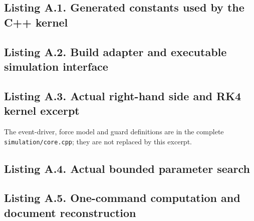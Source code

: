 \documentclass[11pt,a4paper]{article}
\begin{document}
\subsection*{Listing A.1. Generated constants used by the C++ kernel}

\clearpage\subsection*{Listing A.2. Build adapter and executable simulation interface}

\clearpage\subsection*{Listing A.3. Actual right-hand side and RK4 kernel excerpt}

\noindent\small The event-driver, force model and guard definitions are in the complete \texttt{simulation/core.cpp}; they are not replaced by this excerpt.
\clearpage\subsection*{Listing A.4. Actual bounded parameter search}

\clearpage\subsection*{Listing A.5. One-command computation and document reconstruction}

\end{document}
